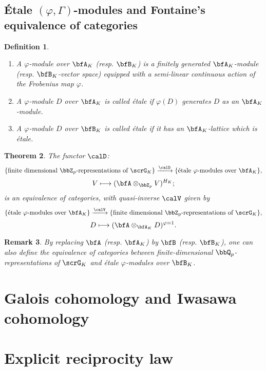 \documentclass[a4paper,oneside]{amsart}
\newtheorem{theorem}{Theorem}[subsection]
\newtheorem{remark}[theorem]{Remark}
\newtheorem{definition}[theorem]{Definition}
\numberwithin{equation}{section}
\numberwithin{figure}{section}
\begin{document}
\subsection{\'Etale $(\varphi,\Gamma)$-modules and Fontaine's equivalence of categories}
\begin{definition}
	\begin{enumerate}
		\item A $\varphi$-module over $\bfA_K$ (resp. $\bfB_K$) is a finitely generated $\bfA_K$-module (resp. $\bfB_K$-vector space) equipped with a semi-linear continuous action of the Frobenius map $\varphi$.
		\item A $\varphi$-module $D$ over $\bfA_K$ is called \'etale if $\varphi(D)$ generates $D$ as an $\bfA_K$-module.
		\item A $\varphi$-module $D$ over $\bfB_K$ is called \'etale if it has an $\bfA_K$-lattice which is \'etale.
	\end{enumerate}
\end{definition}
\begin{theorem}
	The functor $\calD$:
	$$\{\text{finite dimensional }\bbZ_p\text{-representations of }\scrG_K\}\xlto{\calD} \{\text{\'etale } \varphi\text{-modules over }\bfA_K\},$$
	$$V\longmapsto (\bfA\otimes_{\bbZ_p} V)^{H_K};$$
	is an equivalence of categories, with quasi-inverse $\calV$ given by
	$$\{\text{\'etale } \varphi\text{-modules over }\bfA_K\}\xlto{\calV} \{\text{finite dimensional }\bbZ_p\text{-representations of }\scrG_K\},$$
	$$D\longmapsto (\bfA\otimes_{\bfA_K} D)^{\varphi=1}.$$
\end{theorem}
\begin{remark}
	By replacing $\bfA$ (resp. $\bfA_K$) by $\bfB$ (resp. $\bfB_K$), one can also define the equivalence of categories between finite-dimensional $\bbQ_p$-representations of $\scrG_K$ and \'etale $\varphi$-modules over $\bfB_K$.
\end{remark}
\section{Galois cohomology and Iwasawa cohomology}
\section{Explicit reciprocity law}

\printbibliography
\end{document}
